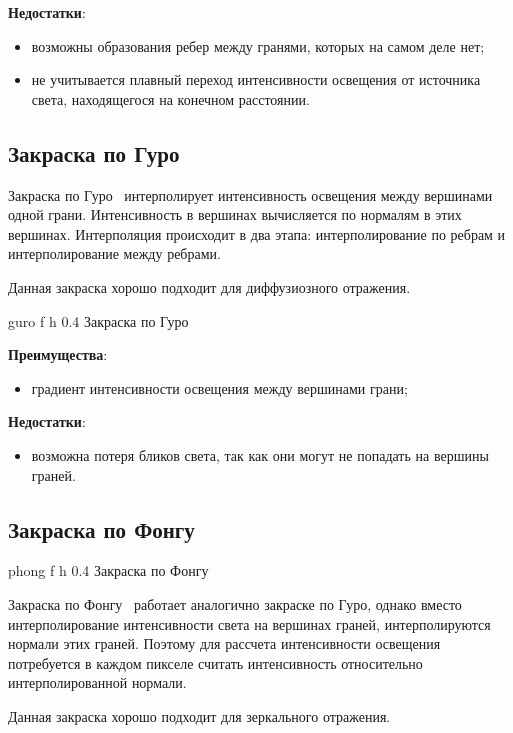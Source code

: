 \textbf{Недостатки}:
\begin{itemize}
    \item возможны образования ребер между гранями, которых на самом деле нет;
    \item не учитывается плавный переход интенсивности освещения от источника света,
        находящегося на конечном расстоянии.
\end{itemize}


\subsection{Закраска по Гуро}

Закраска по Гуро~\cite{guro:1971} интерполирует интенсивность освещения между вершинами одной грани.
Интенсивность в вершинах вычисляется по нормалям в этих вершинах.
Интерполяция происходит в два этапа: интерполирование по ребрам и интерполирование
между ребрами.

Данная закраска хорошо подходит для диффузиозного отражения.

{guro}
{f}
{h}
{0.4\textwidth}
{Закраска по Гуро}


\textbf{Преимущества}:
\begin{itemize}
    \item градиент интенсивности освещения между вершинами грани;
\end{itemize}

\textbf{Недостатки}:
\begin{itemize}
    \item возможна потеря бликов света, так как они могут не попадать на вершины граней.
\end{itemize}


\subsection{Закраска по Фонгу}

{phong}
{f}
{h}
{0.4\textwidth}
{Закраска по Фонгу}

Закраска по Фонгу~\cite{phong:1998} работает аналогично закраске по Гуро, однако вместо интерполирование
интенсивности света на вершинах граней, интерполируются нормали этих граней. Поэтому
для рассчета интенсивности освещения потребуется в каждом пикселе считать интенсивность
относительно интерполированной нормали.

Данная закраска хорошо подходит для зеркального отражения.



